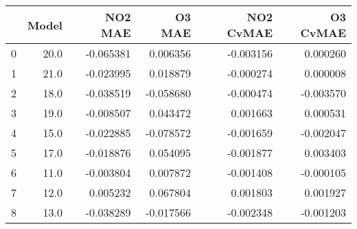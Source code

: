 \begin{tabular}{lrrrrr}
\toprule
{} &  Model &   NO2 MAE &    O3 MAE &  NO2 CvMAE &  O3 CvMAE \\
\midrule
0 &   20.0 & -0.065381 &  0.006356 &  -0.003156 &  0.000260 \\
1 &   21.0 & -0.023995 &  0.018879 &  -0.000274 &  0.000008 \\
2 &   18.0 & -0.038519 & -0.058680 &  -0.000474 & -0.003570 \\
3 &   19.0 & -0.008507 &  0.043472 &   0.001663 &  0.000531 \\
4 &   15.0 & -0.022885 & -0.078572 &  -0.001659 & -0.002047 \\
5 &   17.0 & -0.018876 &  0.054095 &  -0.001877 &  0.003403 \\
6 &   11.0 & -0.003804 &  0.007872 &  -0.001408 & -0.000105 \\
7 &   12.0 &  0.005232 &  0.067804 &   0.001803 &  0.001927 \\
8 &   13.0 & -0.038289 & -0.017566 &  -0.002348 & -0.001203 \\
\bottomrule
\end{tabular}
